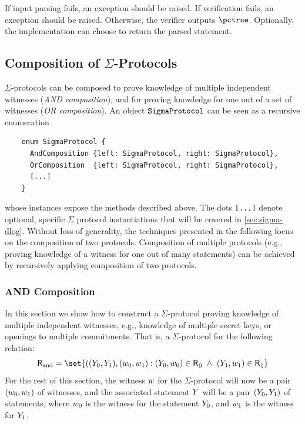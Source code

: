 \documentclass[11pt]{article}
\begin{document}

If input parsing fails, an exception should be raised.
If verification fails, an exception should be raised.
Otherwise, the verifier outputs $\pctrue$. Optionally, the implementation can choose to return the parsed statement.





\subsection{Composition of $\Sigma$-Protocols}
\label{sec:composition}
\label{sec:or-comp}
\label{sec:and-comp}
  $\Sigma$-protocols can be composed to prove knowledge of multiple independent witnesses (\emph{AND composition}), and for proving knowledge for one out of a set of witnesses (\emph{OR composition}). An object $\texttt{SigmaProtocol}$ can be seen as a recursive enumeration

  \begin{verbatim}
    enum SigmaProtocol {
      AndComposition {left: SigmaProtocol, right: SigmaProtocol},
      OrComposition  {left: SigmaProtocol, right: SigmaProtocol},
      [...]
    }
  \end{verbatim}
whose instances expose the methods described above.
The dots \texttt{[...]} denote optional, specific $\Sigma$ protocol instantiations that will be covered in \cref{sec:sigma-dlog}.
  Without loss of generality, the techniques presented in the following focus on the composition of two protocols.
  Composition of multiple protocols (e.g., proving knowledge of a witness for one out of many statements) can be achieved by recursively applying composition of two protocols.

  \subsubsection{AND Composition}
  In this section we show how to construct a $\Sigma$-protocol proving knowledge of multiple independent witnesses, e.g., knowledge of multiple secret keys, or openings to multiple commitments.
  That is, a $\Sigma$-protocol for the following relation:
\[
  \relation[and] = \set{
    ((\statement_0,\statement_1),(\witness_0,\witness_1) : (\statement_0,\witness_0)\in \relation_0 ~\land~ (\statement_1,\witness_1)\in\relation_1}
\]
For the rest of this section, the witness $w$ for the $\Sigma$-protocol will now be a pair $(w_0, w_1)$ of witnesses, and the associated statement $Y$ will be a pair $(Y_0, Y_1)$ of statements, where $w_0$ is the witness for the statement $Y_0$, and $w_1$ is the witness for $Y_1$.
\end{document}
